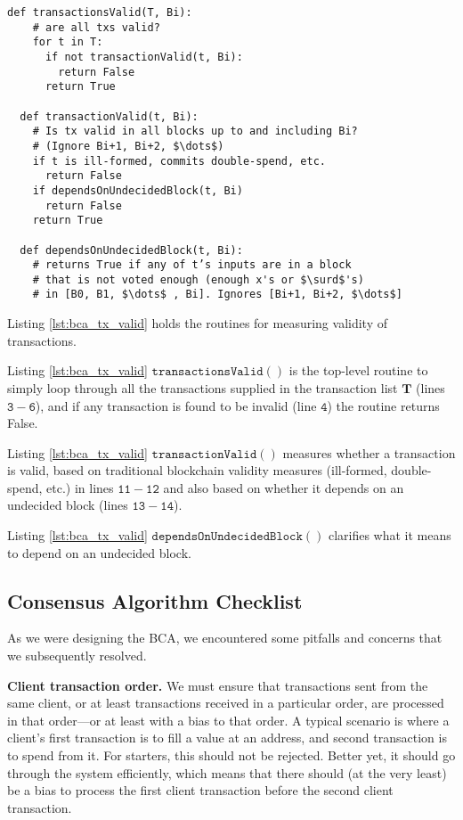 \begin{minipage}{\linewidth}
  \begin{lstlisting}[caption={Routines for transaction validity.}, label={lst:bca_tx_valid}, style=python, mathescape=true]
  def transactionsValid(T, Bi):
    # are all txs valid?
    for t in T:
      if not transactionValid(t, Bi):
        return False
      return True
  
  def transactionValid(t, Bi):
    # Is tx valid in all blocks up to and including Bi? 
    # (Ignore Bi+1, Bi+2, $\dots$) 
    if t is ill-formed, commits double-spend, etc. 
      return False
    if dependsOnUndecidedBlock(t, Bi)
      return False
    return True
    
  def dependsOnUndecidedBlock(t, Bi):
    # returns True if any of t’s inputs are in a block 
    # that is not voted enough (enough x's or $\surd$'s) 
    # in [B0, B1, $\dots$ , Bi]. Ignores [Bi+1, Bi+2, $\dots$]
  \end{lstlisting}
\end{minipage}

\medskip
\noindent Listing \ref{lst:bca_tx_valid} holds the routines for measuring validity of transactions.

\medskip
\noindent Listing \ref{lst:bca_tx_valid} $\mathtt{transactionsValid()}$ is the top-level routine to simply loop through all the transactions supplied in the transaction list $\mathbf{T}$ (lines $\mathtt{3-6}$), and if any transaction is found to be invalid (line $\mathtt{4}$) the routine returns False.

\medskip
\noindent Listing \ref{lst:bca_tx_valid} $\mathtt{transactionValid()}$ measures whether a transaction is valid, based on traditional blockchain validity measures (ill-formed, double-spend, etc.) in lines $\mathtt{11-12}$ and also based on whether it depends on an undecided block (lines $\mathtt{13-14}$).

\medskip
\noindent Listing \ref{lst:bca_tx_valid} $\mathtt{dependsOnUndecidedBlock()}$ clarifies what it means to depend on an undecided block.

\subsection{Consensus Algorithm Checklist}
As we were designing the BCA, we encountered some pitfalls and concerns that we subsequently resolved.

\medskip
\noindent\textbf{Client transaction order.} We must ensure that transactions sent from the same client, or at least transactions received in a particular order, are processed in that order—or at least with a bias to that order.
A typical scenario is where a client’s first transaction is to fill a value at an address, and second transaction is to spend from it.
For starters, this should not be rejected.
Better yet, it should go through the system efficiently, which means that there should (at the very least) be a bias to process the first client transaction before the second client transaction.


